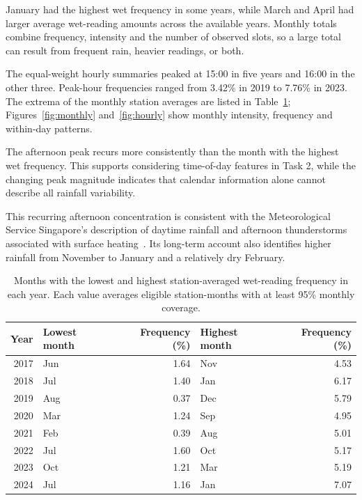 \documentclass[11pt,a4paper]{article}
\begin{document}
January had the highest wet frequency in some years, while March and April
had larger average wet-reading amounts across the available years.
Monthly totals combine frequency, intensity and the number of observed
slots, so a large total can result from frequent rain, heavier readings,
or both.

The equal-weight hourly summaries peaked at 15:00 in five years and 16:00 in
the other three. Peak-hour frequencies ranged from 3.42\% in 2019 to 7.76\%
in 2023. The extrema of the monthly station averages are listed in
Table~\ref{tab:monthly-extrema};
Figures~\ref{fig:monthly} and~\ref{fig:hourly} show monthly intensity,
frequency and within-day patterns.

The afternoon peak recurs more consistently than the month with the highest
wet frequency. This supports considering time-of-day features in Task 2,
while the changing peak magnitude indicates that calendar information alone
cannot describe all rainfall variability.

This recurring afternoon concentration is consistent with the Meteorological
Service Singapore's description of daytime rainfall and afternoon thunderstorms
associated with surface heating~\cite{mss-climate}. Its long-term account also
identifies higher rainfall from November to January and a relatively dry
February.


\begin{table}[htbp]
\centering\scriptsize
\caption{Months with the lowest and highest station-averaged wet-reading
frequency in each year. Each value averages eligible station-months with at
least 95\% monthly coverage.}
\label{tab:monthly-extrema}
\begin{tabular}{r l r l r}
\toprule
Year & Lowest month & Frequency (\%) & Highest month & Frequency (\%) \\
\midrule
2017 & Jun & 1.64 & Nov & 4.53 \\
2018 & Jul & 1.40 & Jan & 6.17 \\
2019 & Aug & 0.37 & Dec & 5.79 \\
2020 & Mar & 1.24 & Sep & 4.95 \\
2021 & Feb & 0.39 & Aug & 5.01 \\
2022 & Jul & 1.60 & Oct & 5.17 \\
2023 & Oct & 1.21 & Mar & 5.19 \\
2024 & Jul & 1.16 & Jan & 7.07 \\
\bottomrule
\end{tabular}
\end{table}
\end{document}
